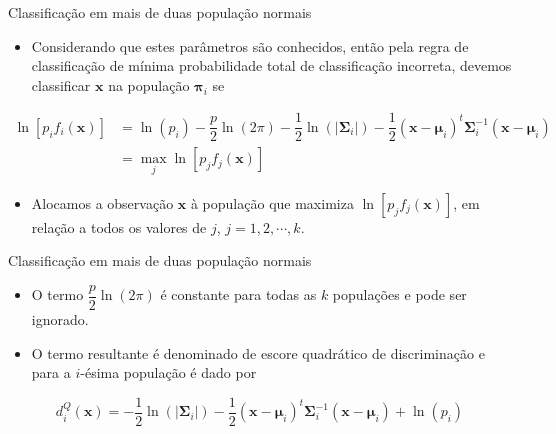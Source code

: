 \documentclass[
  ignorenonframetext,
  aspectratio=169,
]{beamer}
\providecommand{\tightlist}{%
  \setlength{\itemsep}{0pt}\setlength{\parskip}{0pt}}
\begin{document}
\begin{frame}{Classificação em mais de duas população normais}
\label{classificauxe7uxe3o-em-mais-de-duas-populauxe7uxe3o-normais-1}
\begin{itemize}
\tightlist
\item
  Considerando que estes parâmetros são conhecidos, então pela regra de
  classificação de mínima probabilidade total de classificação
  incorreta, devemos classificar \(\boldsymbol{x}\) na população
  \(\boldsymbol{\pi}_i\) se
\end{itemize}

\[
\begin{aligned}
\ln\left[ p_i f_i(\boldsymbol{x})\right] &= \ln\left( p_i\right) - \dfrac{p}{2} \ln\left( 2 \pi\right) - \dfrac{1}{2} \ln \left( |\boldsymbol{\Sigma}_i|\right) - \dfrac{1}{2} \left( \boldsymbol{x} - \boldsymbol{\mu}_i\right) ^t \boldsymbol{\Sigma}_i^{-1} \left( \boldsymbol{x} - \boldsymbol{\mu}_i\right) \\ &= \max_j \ln\left[ p_j f_j(\boldsymbol{x})\right] 
\end{aligned}  
\]

\begin{itemize}
\tightlist
\item
  Alocamos a observação \(\boldsymbol{x}\) à população que maximiza
  \(\ln\left[ p_j f_j(\boldsymbol{x})\right]\), em relação a todos os
  valores de \(j\), \(j = 1,2, \cdots, k\).
\end{itemize}
\end{frame}

\begin{frame}{Classificação em mais de duas população normais}
\label{classificauxe7uxe3o-em-mais-de-duas-populauxe7uxe3o-normais-2}
\begin{itemize}
\tightlist
\item
  O termo \(\dfrac{p}{2} \ln\left( 2 \pi\right)\) é constante para todas
  as \(k\) populações e pode ser ignorado.
\end{itemize}

\pause

\begin{itemize}
\tightlist
\item
  O termo resultante é denominado de escore quadrático de discriminação
  e para a \(i\)-ésima população é dado por
\end{itemize}

\[
d_i^Q(\boldsymbol{x}) =  - \dfrac{1}{2} \ln \left( |\boldsymbol{\Sigma}_i|\right) - \dfrac{1}{2} \left( \boldsymbol{x} - \boldsymbol{\mu}_i\right) ^t \boldsymbol{\Sigma}_i^{-1} \left( \boldsymbol{x} - \boldsymbol{\mu}_i\right) + \ln\left( p_i\right) 
\]
\end{frame}
\end{document}
